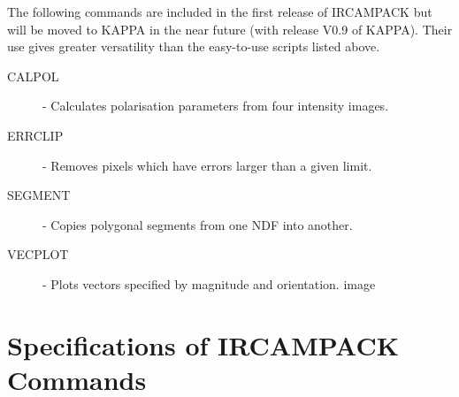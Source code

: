 The following commands are included in the first release of {\small
IRCAMPACK} but will be moved to {\small KAPPA} in the near future (with
release V0.9 of {\small KAPPA}). Their use gives greater versatility
than the easy-to-use scripts listed above.

\begin{description}
\item [CALPOL] - Calculates polarisation parameters from four intensity images.
\item [ERRCLIP] - Removes pixels which have errors larger than a given limit.
\item [SEGMENT] - Copies polygonal segments from one NDF into another.
\item [VECPLOT] - Plots vectors specified by magnitude and orientation.
image
\end{description}

\newpage
\section{Specifications of IRCAMPACK Commands}
\label{APP:FULL}

